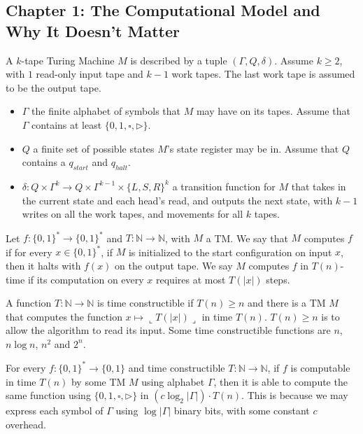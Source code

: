 \subsection*{Chapter 1: The Computational Model and Why It Doesn't Matter}
\begin{note}
  A $k$-tape Turing Machine $M$ is described by a tuple $(\Gamma, Q, \delta)$.
  Assume $k \geq 2$, with $1$ read-only input tape and $k - 1$ work tapes.
  The last work tape is assumed to be the output tape.
  \begin{itemize}
    \item
      $\Gamma$ the finite alphabet of symbols that $M$ may have on its tapes.
      Assume that $\Gamma$ contains at least $\{0,1,\square,\triangleright\}$.

    \item
      $Q$ a finite set of possible states $M$'s state register may be in.
      Assume that $Q$ contains a $q_{start}$ and $q_{halt}$.

    \item
      $\delta : Q \times \Gamma^k \to Q
      \times \Gamma^{k - 1} \times \{L, S, R\}^k$ a transition function for
      $M$ that takes in the current state and each head's read, and outputs
      the next state, with $k - 1$ writes on all the work tapes, and movements
      for all $k$ tapes.
  \end{itemize}
\end{note}

\begin{note}
  Let $f : \{0, 1\}^\ast \to \{0, 1\}^\ast$ and
  $T : \mathbb{N} \to \mathbb{N}$, with $M$ a TM.
  We say that $M$ computes $f$ if for every $x \in \{0, 1\}^\ast$, if
  $M$ is initialized to the start configuration on input $x$, then it halts
  with $f(x)$ on the output tape.
  We say $M$ computes $f$ in $T(n)$-time if its computation on every
  $x$ requires at most $T(|x|)$ steps.
\end{note}

\begin{note}
  A function $T: \mathbb{N} \to \mathbb{N}$ is time constructible if
  $T(n) \geq n$ and there is a TM $M$ that computes the function
  $x \mapsto \llcorner T(|x|) \lrcorner$ in time $T(n)$.
  $T(n) \geq n$ is to allow the algorithm to read its input.
  Some time constructible functions are $n$, $n \log n$, $n^2$ and $2^n$.
\end{note}

\begin{note}
  For every $f : \{0, 1\}^\ast \to \{0, 1\}$ and time constructible
  $T : \mathbb{N} \to \mathbb{N}$, if $f$ is computable in time $T(n)$ by
  some TM $M$ using alphabet $\Gamma$, then it is able to compute the same
  function using $\{0, 1, \square, \triangleright\}$ in
  $\left(c \log_2 | \Gamma| \right) \cdot T(n)$.
  This is because we may express each symbol of $\Gamma$ using
  $\log |\Gamma|$ binary bits, with some constant $c$ overhead.
\end{note}

